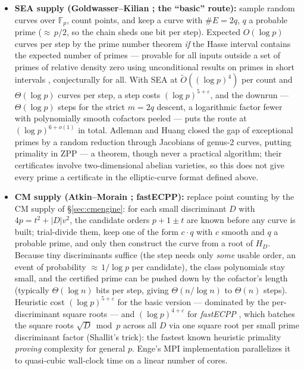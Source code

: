 \documentclass[11pt]{amsart}
\newcommand{\F}{\mathbb{F}}
\newcommand{\Ot}{\widetilde{O}}
\newcommand{\eps}{\varepsilon}
\theoremstyle{plain}
\theoremstyle{definition}
\theoremstyle{remark}
\begin{document}
\begin{itemize}
\item \textbf{SEA supply (Goldwasser--Kilian \cite{GK86}; the ``basic'' route):} sample random curves
over $\F_p$, count points, and keep a curve with $\#E = 2q$, $q$ a probable prime (${\approx}\,p/2$, so
the chain sheds one bit per step).  Expected $O(\log p)$ curves per step by the prime number theorem
\emph{if} the Hasse interval contains the expected number of primes --- provable for all inputs outside
a set of primes of relative density zero using unconditional results on primes in short intervals
\cite{HB88}, conjecturally for all.  With SEA at $\Ot((\log p)^4)$ per count and $\Theta(\log p)$
curves per step, a step costs $(\log p)^{5+\eps}$, and the downrun --- $\Theta(\log p)$ steps for the
strict $m = 2q$ descent, a logarithmic factor fewer with polynomially smooth cofactors peeled ---
puts the route at $(\log p)^{6+o(1)}$ in total.
Adleman and Huang \cite{AH92} closed the gap of exceptional primes by a random reduction through
Jacobians of genus-2 curves, putting primality in ZPP --- a theorem, though never a practical
algorithm; their certificates involve two-dimensional abelian varieties, so this does not give
every prime a certificate in the elliptic-curve format defined above.
\item \textbf{CM supply (Atkin--Morain \cite{AM93}; fastECPP):} replace point counting by the CM supply
of \S\ref{sec:cmengine}: for each small discriminant $D$ with $4p = t^2+|D|v^2$, the candidate orders
$p+1\pm t$ are known before any curve is built; trial-divide them, keep one of the form $c\cdot q$ with
$c$ smooth and $q$ a probable prime, and only then construct the curve from a root of $H_D$.  Because
tiny discriminants suffice (the step needs only \emph{some} usable order, an event of probability
${\approx}\,1/\log p$ per candidate), the class polynomials stay small, and the certified prime can be
pushed down by the cofactor's length (typically $\Theta(\log n)$ bits per step, giving
$\Theta(n/\log n)$ to $\Theta(n)$ steps).  Heuristic cost $(\log p)^{5+\eps}$ for the basic version ---
dominated by the per-discriminant square roots --- and $(\log p)^{4+\eps}$ for \emph{fastECPP}
\cite{FKMW04,Mor07}, which batches the square roots $\sqrt D \bmod p$ across all $D$ via one square
root per small prime discriminant factor (Shallit's trick): the fastest known heuristic primality
\emph{proving} complexity for general $p$.  Enge's MPI implementation \cite{Enge24} parallelizes it to
quasi-cubic wall-clock time on a linear number of cores.
\end{itemize}
\end{document}
